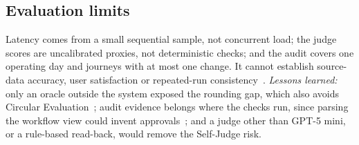 
\subsection{Evaluation limits}

Latency comes from a small sequential sample, not concurrent load; the judge scores are uncalibrated proxies, not deterministic checks; and the audit covers one operating day and journeys with at most one change. It cannot establish source-data accuracy, user satisfaction or repeated-run consistency~\citep{h2verification,h2evaluation}. \emph{Lessons learned:} only an oracle outside the system exposed the rounding gap, which also avoids Circular Evaluation~\citep{handschuh2026patterns}; audit evidence belongs where the checks run, since parsing the workflow view could invent approvals~\citep{h2adr0004}; and a judge other than GPT-5 mini, or a rule-based read-back, would remove the Self-Judge risk.
